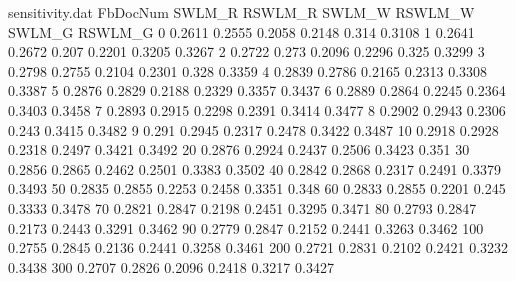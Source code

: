 \begin{filecontents*}{sensitivity.dat}
FbDocNum	SWLM_R	RSWLM_R	SWLM_W	RSWLM_W	SWLM_G	RSWLM_G
0	0.2611	0.2555	0.2058	0.2148	0.314	0.3108
1	0.2641	0.2672	0.207	0.2201	0.3205	0.3267
2	0.2722	0.273	0.2096	0.2296	0.325	0.3299
3	0.2798	0.2755	0.2104	0.2301	0.328	0.3359
4	0.2839	0.2786	0.2165	0.2313	0.3308	0.3387
5	0.2876	0.2829	0.2188	0.2329	0.3357	0.3437
6	0.2889	0.2864	0.2245	0.2364	0.3403	0.3458
7	0.2893	0.2915	0.2298	0.2391	0.3414	0.3477
8	0.2902	0.2943	0.2306	0.243	0.3415	0.3482
9	0.291	0.2945	0.2317	0.2478	0.3422	0.3487
10	0.2918	0.2928	0.2318	0.2497	0.3421	0.3492
20	0.2876	0.2924	0.2437	0.2506	0.3423	0.351
30	0.2856	0.2865	0.2462	0.2501	0.3383	0.3502
40	0.2842	0.2868	0.2317	0.2491	0.3379	0.3493
50	0.2835	0.2855	0.2253	0.2458	0.3351	0.348
60	0.2833	0.2855	0.2201	0.245	0.3333	0.3478
70	0.2821	0.2847	0.2198	0.2451	0.3295	0.3471
80	0.2793	0.2847	0.2173	0.2443	0.3291	0.3462
90	0.2779	0.2847	0.2152	0.2441	0.3263	0.3462
100	0.2755	0.2845	0.2136	0.2441	0.3258	0.3461
200	0.2721	0.2831	0.2102	0.2421	0.3232	0.3438
300	0.2707	0.2826	0.2096	0.2418	0.3217	0.3427
\end{filecontents*}